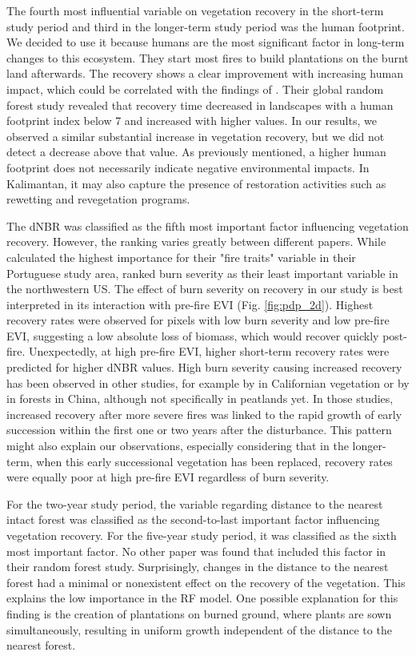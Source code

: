 \documentclass[
  fontsize=12pt,
  paper=a4,
  parskip=half,
  headings=big,
  DIV=12
]{scrreprt}
\begin{document}
The fourth most influential variable on vegetation recovery in the short-term study period and third in the longer-term study period was the human footprint. We decided to use it because humans are the most significant factor in long-term changes to this ecosystem. They start most fires to build plantations on the burnt land afterwards.
The recovery shows a clear improvement with increasing human impact, which could be correlated with the findings of \textcite{xu_global_2024}. Their global random forest study revealed that recovery time decreased in landscapes with a human footprint index below 7 and increased with higher values. In our results, we observed a similar substantial increase in vegetation recovery, but we did not detect a decrease above that value. As previously mentioned, a higher human footprint does not necessarily indicate negative environmental impacts. In Kalimantan, it may also capture the presence of restoration activities such as rewetting and revegetation programs.

The dNBR was classified as the fifth most important factor influencing vegetation recovery. However, the ranking varies greatly between different papers. While \textcite{joao_indicator-based_2018} calculated the highest importance for their "fire traits" variable in their Portuguese study area, \textcite{zahura_impact_2024} ranked burn severity as their least important variable in the northwestern US.
The effect of burn severity on recovery in our study is best interpreted in its interaction with pre-fire EVI (Fig. \ref{fig:pdp_2d}). Highest recovery rates were observed for pixels with low burn severity and low pre-fire EVI, suggesting a low absolute loss of biomass, which would recover quickly post-fire. Unexpectedly, at high pre-fire EVI, higher short-term recovery rates were predicted for higher dNBR values. High burn severity causing increased recovery has been observed in other studies, for example by \textcite{qiu_higher_2023} in Californian vegetation or by \textcite{hao_long-term_2022} in forests in China, although not specifically in peatlands yet. In those studies, increased recovery after more severe fires was linked to the rapid growth of early succession within the first one or two years after the disturbance. This pattern might also explain our observations, especially considering that in the longer-term, when this early successional vegetation has been replaced, recovery rates were equally poor at high pre-fire EVI regardless of burn severity.

For the two-year study period, the variable regarding distance to the nearest intact forest was classified as the second-to-last important factor influencing vegetation recovery. For the five-year study period, it was classified as the sixth most important factor. No other paper was found that included this factor in their random forest study.
Surprisingly, changes in the distance to the nearest forest had a minimal or nonexistent effect on the recovery of the vegetation. This explains the low importance in the RF model. One possible explanation for this finding is the creation of plantations on burned ground, where plants are sown simultaneously, resulting in uniform growth independent of the distance to the nearest forest.
\end{document}
